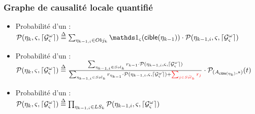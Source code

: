 \begin{frame}
\frametitle{Graphe de causalité locale quantifié}

 \begin{itemize}
  
 \item Probabilité d'un  :\\
 $\GProbLS{\n}{\ctx}{\cwG}{k}$\\
 \medskip
 \pause
 \item Probabilité d'un  :\\
 $\GProbObjn{\n}{\ctx}{\cwG}{k}$\\
 \medskip
 \pause
 \item Probabilité d'un  :\\
 $\GProbSol{\n}{\ctx}{\cwG}{k}$
 \end{itemize}
 \pause
   \begin{center}\scalebox{\scaleex}{
    
    \exqlcggaidef
   
   }\end{center}
   


\end{frame}
